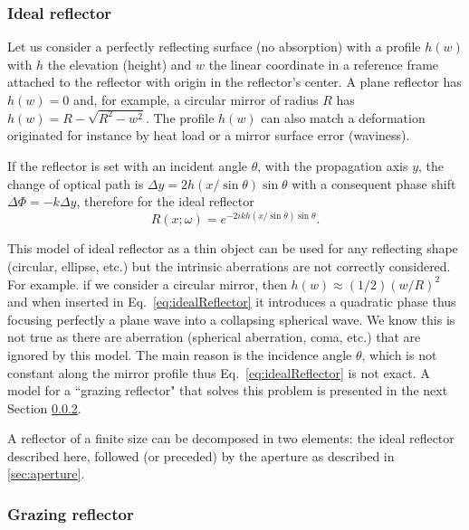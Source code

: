 \documentclass[preprint]{iucr}
\begin{document}
\subsubsection{Ideal reflector}
\label{sec:idealReflector}

Let us consider a perfectly reflecting surface (no absorption) with a profile $h(w)$ with $h$ the elevation (height) and $w$ the linear coordinate in a reference frame attached to the reflector with origin in the reflector's center. A plane reflector has $h(w)=0$ and, for example, a circular mirror of radius $R$ has $h(w)=R-\sqrt{R^2 - w^2}$. The profile $h(w)$ can also match a deformation originated for instance by heat load or a mirror surface error (waviness).

If the reflector is set with an incident angle $\theta$, with the propagation axis $y$, the change of optical path is $\Delta y = 2 h(x/\sin \theta) \sin \theta$ with a consequent phase shift $\Delta \Phi = - k \Delta y $, therefore for the ideal reflector
\begin{equation}
\label{eq:idealReflector}
    R(x;\omega) = e^{-2 i k h(x/\sin \theta) \sin \theta}.
\end{equation} 

This model of ideal reflector as a thin object  can be used for any reflecting shape (circular, ellipse, etc.) but the intrinsic aberrations are not correctly considered. For example. if we consider a circular mirror, then $h(w) \approx (1/2) (w/R)^2$ and when inserted in Eq.~\ref{eq:idealReflector} it introduces a quadratic phase thus focusing perfectly a plane wave into a collapsing spherical wave. We know this is not true as there are aberration (spherical aberration, coma, etc.) that are ignored by this model. The main reason is the incidence angle $\theta$, which is not constant along the mirror profile thus Eq.~\ref{eq:idealReflector} is not exact. A model for a ``grazing reflector" that solves this problem is presented in the next Section \ref{sec:grazingReflector}.

A reflector of a finite size can be decomposed in two elements: the ideal reflector described here, followed (or preceded) by the aperture as described in \ref{sec:aperture}.

\subsubsection{Grazing reflector}
\label{sec:grazingReflector}
\end{document}
